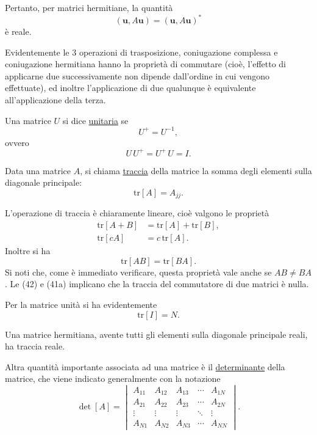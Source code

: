 \documentclass[11pt, a4paper]{book}
\numberwithin{equation}{section}
\begin{document}
Pertanto, per matrici hermitiane, la quantità
\begin{equation}
    (\mathbf{u}, A\mathbf{u}) = (\mathbf{u}, A\mathbf{u})^*
    \tag{38b}
\end{equation}
è reale.

Evidentemente le 3 operazioni di trasposizione, coniugazione complessa e coniugazione hermitiana hanno la proprietà di commutare (cioè, l'effetto di applicarne due successivamente non dipende dall'ordine in cui vengono effettuate), ed inoltre l'applicazione di due qualunque è equivalente all'applicazione della terza.

Una matrice $U$ si dice \uline{unitaria} se
\begin{equation}
    U^+ = U^{-1},
    \tag{39a}
\end{equation}
ovvero
\begin{equation}
    U\,U^+ = U^+\, U = I.
    \tag{39b}
\end{equation}

Data una matrice $A$, si chiama \uline{traccia} della matrice la somma degli elementi sulla diagonale principale:
\begin{equation}
    \mathrm{tr}[A] = A_{jj}.
    \tag{40}
\end{equation}

L'operazione di traccia è chiaramente lineare, cioè valgono le proprietà
\begin{align}
    \mathrm{tr}[A + B] &= \mathrm{tr}[A] + \mathrm{tr}[B],
    \tag{41a} \\
    \mathrm{tr}[c A] &= c\, \mathrm{tr}[A].
    \tag{41b}
\end{align}
Inoltre si ha
\begin{equation}
    \mathrm{tr}[AB] = \mathrm{tr}[BA].
    \tag{42}
\end{equation}
Si noti che, come è immediato verificare, questa proprietà vale anche se $AB \neq BA$. Le (42) e (41a) implicano che la traccia del commutatore di due matrici è nulla.

Per la matrice unità si ha evidentemente
\begin{equation}
    \mathrm{tr}[I] = N.
    \tag{43}
\end{equation}

Una matrice hermitiana, avente tutti gli elementi sulla diagonale principale reali, ha traccia reale.

Altra quantità importante associata ad una matrice è il \uline{determinante} della matrice, che viene indicato generalmente con la notazione
\[
\det[A] =
\begin{vmatrix}
A_{11} & A_{12} & A_{13} & \cdots & A_{1N} \\
A_{21} & A_{22} & A_{23} & \cdots & A_{2N} \\
\vdots & \vdots & \vdots & \ddots & \vdots \\
A_{N1} & A_{N2} & A_{N3} & \cdots & A_{NN}
\end{vmatrix}.
\]
\end{document}

